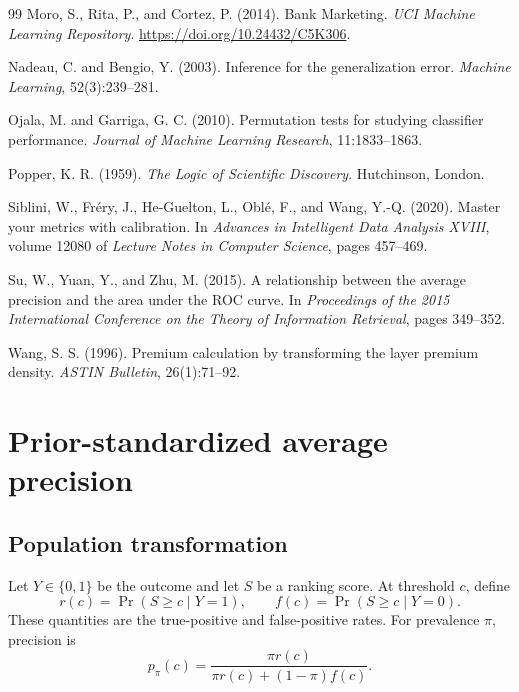 \documentclass[11pt]{article}
\theoremstyle{remark}
\begin{document}
\begin{thebibliography}{99}
Moro, S., Rita, P., and Cortez, P. (2014).
Bank Marketing.
\emph{UCI Machine Learning Repository}.
\url{https://doi.org/10.24432/C5K306}.

Nadeau, C. and Bengio, Y. (2003).
Inference for the generalization error.
\emph{Machine Learning}, 52(3):239--281.

Ojala, M. and Garriga, G. C. (2010).
Permutation tests for studying classifier performance.
\emph{Journal of Machine Learning Research}, 11:1833--1863.

Popper, K. R. (1959).
\emph{The Logic of Scientific Discovery}.
Hutchinson, London.

Siblini, W., Fr\'ery, J., He-Guelton, L., Obl\'e, F., and Wang, Y.-Q. (2020).
Master your metrics with calibration.
In \emph{Advances in Intelligent Data Analysis XVIII}, volume 12080 of \emph{Lecture Notes in Computer Science}, pages 457--469.

Su, W., Yuan, Y., and Zhu, M. (2015).
A relationship between the average precision and the area under the ROC curve.
In \emph{Proceedings of the 2015 International Conference on the Theory of Information Retrieval}, pages 349--352.

Wang, S. S. (1996).
Premium calculation by transforming the layer premium density.
\emph{ASTIN Bulletin}, 26(1):71--92.

\end{thebibliography}


\newpage
\appendix

\section{Prior-standardized average precision}
\label{app:prevalence}

\subsection{Population transformation}

Let $Y\in\{0,1\}$ be the outcome and let $S$ be a ranking score. At threshold $c$, define
\[
r(c)=\Pr(S\geq c\mid Y=1),
\qquad
f(c)=\Pr(S\geq c\mid Y=0).
\]
These quantities are the true-positive and false-positive rates. For prevalence $\pi$, precision is
\[
p_{\pi}(c)
=
\frac{\pi r(c)}{\pi r(c)+(1-\pi)f(c)}.
\]
\end{document}

